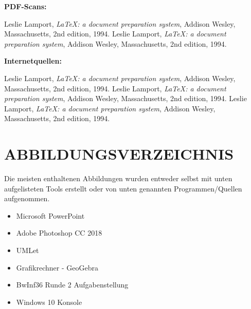 \documentclass[a4paper,12pt]{article}
\begin{document}
\begin{large}
\textbf{PDF-Scans:}
\end{large}

\begin{thebibliography}{9}

      Leslie Lamport,
      \textit{\LaTeX: a document preparation system},
      Addison Wesley, Massachusetts,
      2nd edition,
      1994.
      Leslie Lamport,
      \textit{\LaTeX: a document preparation system},
      Addison Wesley, Massachusetts,
      2nd edition,
      1994.

\end{thebibliography}

\vspace{1cm}

\begin{large}
\textbf{Internetquellen:}
\end{large}

\begin{thebibliography}{9}

      Leslie Lamport,
      \textit{\LaTeX: a document preparation system},
      Addison Wesley, Massachusetts,
      2nd edition,
      1994.
      Leslie Lamport,
      \textit{\LaTeX: a document preparation system},
      Addison Wesley, Massachusetts,
      2nd edition,
      1994.
      Leslie Lamport,
      \textit{\LaTeX: a document preparation system},
      Addison Wesley, Massachusetts,
      2nd edition,
      1994.

\end{thebibliography}

\endgroup


\newpage
\section{ABBILDUNGSVERZEICHNIS}
Die meisten enthaltenen Abbildungen wurden entweder selbst mit unten aufgelisteten Tools erstellt oder von unten genannten Programmen/Quellen aufgenommen.
\begin{itemize}
\item Microsoft PowerPoint
\item Adobe Photoshop CC 2018
\item UMLet
\item Grafikrechner - GeoGebra
\item BwInf36 Runde 2 Aufgabenstellung
\item Windows 10 Konsole
\end{itemize}
\end{document}
